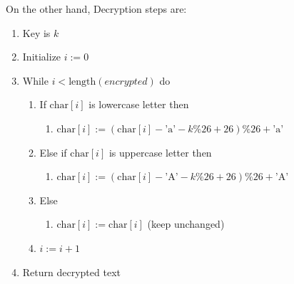 On the other hand, Decryption steps are:
\begin{enumerate}
  \item Key is $k$
  \item Initialize $i := 0$
  \item While $i < \text{length}(encrypted)$ do
  \begin{enumerate}
    \item If $\text{char}[i]$ is lowercase letter then
    \begin{enumerate}
      \item $\text{char}[i] := (\text{char}[i] - \text{'a'} - k \% 26 + 26) \% 26 + \text{'a'}$
    \end{enumerate}
    \item Else if $\text{char}[i]$ is uppercase letter then
    \begin{enumerate}
      \item $\text{char}[i] := (\text{char}[i] - \text{'A'} - k \% 26 + 26) \% 26 + \text{'A'}$
    \end{enumerate}
    \item Else
    \begin{enumerate}
      \item $\text{char}[i] := \text{char}[i]$ (keep unchanged)
    \end{enumerate}
    \item $i := i + 1$
  \end{enumerate}
  \item Return decrypted text
\end{enumerate}


